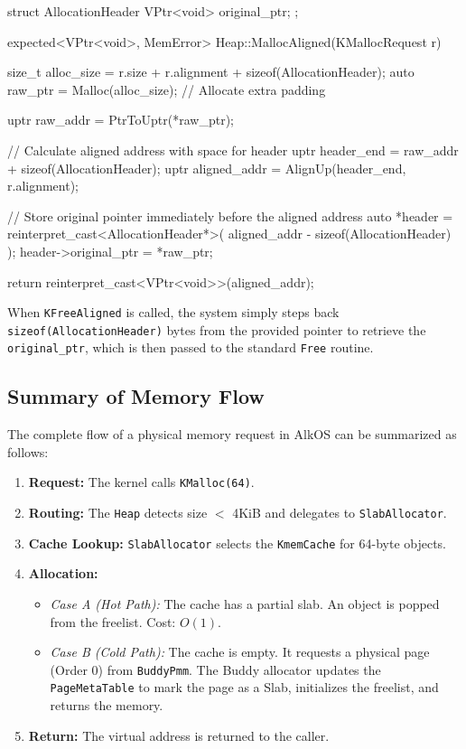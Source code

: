 \documentclass[a4paper,10pt,twoside]{report}
\theoremstyle{definition}
\begin{document}
\begin{cppcode}[caption={Aligned Allocation Strategy}, label={lst:aligned_alloc}]
struct AllocationHeader {
    VPtr<void> original_ptr;
};

expected<VPtr<void>, MemError> Heap::MallocAligned(KMallocRequest r) {
    size_t alloc_size = r.size + r.alignment + sizeof(AllocationHeader);
    auto raw_ptr = Malloc(alloc_size); // Allocate extra padding

    uptr raw_addr = PtrToUptr(*raw_ptr);
    
    // Calculate aligned address with space for header
    uptr header_end = raw_addr + sizeof(AllocationHeader);
    uptr aligned_addr = AlignUp(header_end, r.alignment);

    // Store original pointer immediately before the aligned address
    auto *header = reinterpret_cast<AllocationHeader*>(
        aligned_addr - sizeof(AllocationHeader)
    );
    header->original_ptr = *raw_ptr;

    return reinterpret_cast<VPtr<void>>(aligned_addr);
}
\end{cppcode}

When \texttt{KFreeAligned} is called, the system simply steps back \texttt{sizeof(AllocationHeader)} bytes from the provided pointer to retrieve the \texttt{original\_ptr}, which is then passed to the standard \texttt{Free} routine.

\subsection{Summary of Memory Flow}

The complete flow of a physical memory request in AlkOS can be summarized as follows:

\begin{enumerate}
    \item \textbf{Request:} The kernel calls \texttt{KMalloc(64)}.
    \item \textbf{Routing:} The \texttt{Heap} detects size $<$ 4KiB and delegates to \texttt{SlabAllocator}.
    \item \textbf{Cache Lookup:} \texttt{SlabAllocator} selects the \texttt{KmemCache} for 64-byte objects.
    \item \textbf{Allocation:}
    \begin{itemize}
        \item \textit{Case A (Hot Path):} The cache has a partial slab. An object is popped from the freelist. Cost: $O(1)$.
        \item \textit{Case B (Cold Path):} The cache is empty. It requests a physical page (Order 0) from \texttt{BuddyPmm}. The Buddy allocator updates the \texttt{PageMetaTable} to mark the page as a Slab, initializes the freelist, and returns the memory.
    \end{itemize}
    \item \textbf{Return:} The virtual address is returned to the caller.
\end{enumerate}
\end{document}
